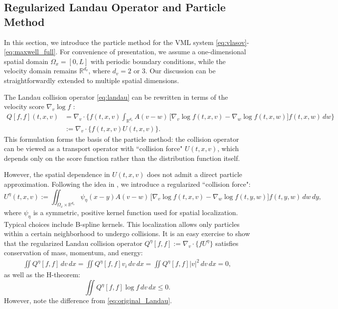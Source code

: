 \documentclass[]{article}
\newcommand{\R}{\mathbb{R}}
\numberwithin{equation}{section}
\begin{document}
\subsection{Regularized Landau Operator and Particle Method}
\label{sec:particles}

In this section, we introduce the particle method for the VML system \eqref{eq:vlasov}-\eqref{eq:maxwell_full}. For convenience of presentation, we assume a one-dimensional spatial domain $\Omega_x=[0,L]$ with periodic boundary conditions, while the velocity domain remains $\R^{d_v}$, where $d_v=2$ or $3$. Our discussion can be straightforwardly extended to multiple spatial dimensions.

The Landau collision operator \eqref{eq:landau} can be rewritten in terms of the velocity score $\nabla_v \log f$ \citep{villani1998spatially, carrillo2020particle}:
\begin{align}
\label{eq:landau_score1}
Q[f, f](t, x, v) &= \nabla_v \cdot \bigg\{ f(t,x,v) \int_{\R^{d_v}} A(v - w)\, \big[ \nabla_v \log f(t,x,v) - \nabla_w \log f(t,x,w) \big]f(t,x,w)  \, dw \bigg\}\\
&:=\nabla_v \cdot \bigg\{ f(t,x,v) U(t,x,v)\bigg\}.
\end{align}
This formulation forms the basis of the particle method: the collision operator can be viewed as a transport operator with ``collision force" $U(t,x,v)$, which depends only on the score function rather than the distribution function itself. 

However, the spatial dependence in $U(t,x,v)$ does not admit a direct particle approximation. Following the idea in \citep{bailo2024collisional}, we introduce a regularized ``collision force":
\begin{equation}
\label{eq:landau_score2}
U^{\eta}(t,x,v) :=\iint_{\Omega_x\times\R^{d_v}} \psi_{\eta}(x-y)A(v - w)\,  \big[ \nabla_v \log f(t,x,v) - \nabla_w \log f(t,y,w) \big] f(t,y,w)\, dw \,dy,
\end{equation}
where $\psi_\eta$ is a symmetric, positive kernel function used for spatial localization. Typical choices include B-spline kernels. This localization allows only particles within a certain neighborhood to undergo collisions. It is an easy exercise to show that the regularized Landau collision operator $Q^{\eta}[f,f]:=\nabla_v\cdot \{ f U^\eta\}$ satisfies conservation of mass, momentum, and energy:
\begin{align}
\iint Q^\eta[f,f]\, dv\,dx=\iint Q^\eta[f,f] v_i\, dv\,dx=\iint Q^\eta[f,f]|v|^2\, dv\,dx=0,
\end{align}
as well as the H-theorem:
\begin{equation}
\iint Q^{\eta}[f,f]\log f\,dv \,dx\leq 0.
\end{equation}
However, note the difference from \eqref{eq:original_Landau}.
\end{document}

